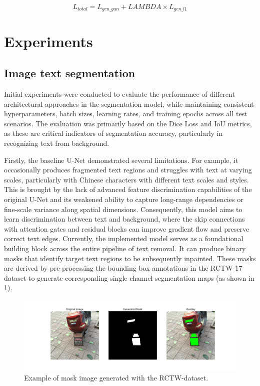 \documentclass[10pt,twocolumn,letterpaper]{article}
\begin{document}
\begin{equation}
    L_{total} = L_{gen\_gan} + LAMBDA \times L_{gen\_l1}
    \label{eq:inpainting_loss}
\end{equation}

\section{Experiments}

\subsection{Image text segmentation}
Initial experiments were conducted to evaluate the performance of different architectural approaches in the segmentation model, while maintaining consistent 
hyperparameters, batch sizes, learning rates, and training epochs across all test scenarios. The evaluation was primarily based on the Dice Loss and 
IoU metrics, as these are critical indicators of segmentation accuracy, particularly in recognizing text from background.

Firstly, the baseline U-Net demonstrated several limitations. For example, it occasionally produces fragmented text regions and struggles with text at varying scales, 
particularly with Chinese characters with different text scales and styles. This is brought by the lack of advanced feature discrimination capabilities of the original 
U-Net and its weakened ability to capture long-range dependencies or fine-scale variance along spatial dimensions. Consequently, this model aims to learn 
discrimination between text and background, where the skip connections with attention gates and residual blocks can improve gradient flow and preserve correct text edges. 
Currently, the implemented model serves as a foundational building block across the entire pipeline of text removal. It can produce binary masks that identify target text regions 
to be subsequently inpainted. These masks are derived by pre-processing the bounding box annotations in the RCTW-17 dataset to generate corresponding single-channel segmentation maps 
(as shown in \cref{fig:verify}).

\begin{figure}[t]
    \centering
    \includegraphics[width=\linewidth]{figures/milestone/verify_1.png}
    \caption{Example of mask image generated with the RCTW-dataset.}
    \label{fig:verify}
\end{figure}
\end{document}
